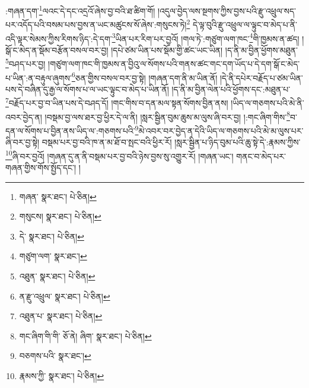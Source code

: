 :གཞན་དག་\footnote{གཞན་  སྣར་ཐང་།  པེ་ཅིན། }ལའང་དེ་དང་འདྲའོ་ཞེས་བྱ་བའི་ཐ་ཚིག་གོ། །འདུལ་བྱེད་ལས་སྔགས་ཀྱིས་བྱས་པའི་རྫུ་འཕྲུལ་སད་པར་འདོད་པའི་བསམ་པས་བྱས་ན་ཡང་མཚུངས་སོ་ཞེས་:གསུངས་ཏེ།\footnote{གསུངས།  སྣར་ཐང་།  པེ་ཅིན། } དེ་ལྟ་བུའི་རྫུ་འཕྲུལ་ལ་ལྟུང་བ་མེད་པ་ནི་འདི་ལྟར་སེམས་ཀྱིས་རིགས་ཉིད་:དེ་དག་\footnote{དེ་  སྣར་ཐང་།  པེ་ཅིན། }ཡིན་པར་རིག་པར་བྱའོ། །གལ་ཏེ་:གཙུག་ལག་ཁང་\footnote{གཙུག་ལག་  སྣར་ཐང་། }གི་ཁྱམས་ན་ཚད། །སྒོ་ང་མེད་ན་སྡོམ་བརྩོན་བསལ་བར་བྱ། །དཔེ་ཙམ་ཡིན་པས་སྡོམ་གྱི་ཚང་ཡང་ཡིན། །ད་ནི་མ་བྱིན་ཕྱོགས་མཐུན་\footnote{འཐུན་  སྣར་ཐང་།  པེ་ཅིན། }བཤད་པར་བྱ། །གཙུག་ལག་ཁང་གི་ཁྱམས་ན་བྱིའུ་ལ་སོགས་པའི་གནས་ཚང་གང་དག་ཡོད་པ་དེ་དག་སྒོ་ང་མེད་པ་ཡིན་:ན་བརྟུལ་ཞུགས་\footnote{ན་རྫུ་འཕྲུལ་  སྣར་ཐང་།  པེ་ཅིན། }ཅན་གྱིས་བསལ་བར་བྱ་སྟེ། །གཞན་དག་ནི་མ་ཡིན་ནོ། །དེ་ནི་དཔེར་བརྗོད་པ་ཙམ་ཡིན་པས་དེ་བཞིན་དུ་རྒྱ་ལ་སོགས་པ་ལ་ཡང་ལྟུང་བ་མེད་པ་ཡིན་ནོ། །ད་ནི་མ་བྱིན་ལེན་པའི་ཕྱོགས་དང་:མཐུན་པ་\footnote{འཐུན་པ་  སྣར་ཐང་།  པེ་ཅིན། }བརྗོད་པར་བྱ་བ་ཡིན་པས་དེ་བཤད་དོ། །གང་གིས་བ་དན་མལ་སྟན་སོགས་བྱིན་ནས། །ཡིད་ལ་གཅགས་པའི་མེ་ནི་འབར་བྱེད་ན། །བསྡམ་བྱ་ལས་ཐར་བྱ་ཕྱིར་དེ་ལ་ནི། །སླར་སྦྱིན་བུམ་ཆུས་མ་ལུས་ཞི་བར་བྱ། །:གང་ཞིག་གིས་\footnote{གང་ཞིག་ིག་གི་  ཅོ་ནེ། ཞིག་  སྣར་ཐང་།  པེ་ཅིན། }བ་དན་ལ་སོགས་པ་བྱིན་ནས་ཡིད་ལ་:གཅགས་པའི་\footnote{བཅགས་པའི་  སྣར་ཐང་། }མེ་འབར་བར་བྱེད་ན་དེའི་ཡིད་ལ་གཅགས་པའི་མེ་མ་ལུས་པར་ཞི་བར་བྱ་སྟེ། བསྡམ་པར་བྱ་བའི་ཁ་ན་མ་ཐོ་བ་སྤང་བའི་ཕྱིར་རོ། །སླར་སྦྱིན་པ་ཉིད་བུམ་པའི་ཆུ་སྟེ་དེ་:རྣམས་ཀྱིས་\footnote{རྣམས་ཀྱི་  སྣར་ཐང་།  པེ་ཅིན། }ཞི་བར་བྱའོ། །གཞན་དུ་ན་ནི་བསྡམ་པར་བྱ་བའི་ཉེས་བྱས་སུ་འགྱུར་རོ། །གཞན་ཡང་། གནང་བ་མེད་པར་གཞན་གྱིས་གོས་སྤྱོད་དང་། །
